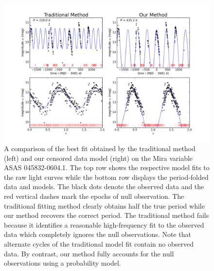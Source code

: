 \documentclass[12pt,preprint]{aastex}
\begin{document}
\clearpage
\begin{figure}
  \begin{center}
\includegraphics[angle=0,width=6.5in]{fig_045832-0604_1.png}
  \end{center}
  \caption{A comparison of the best fit obtained by the traditional method (left) and our censored data model (right) on the Mira variable ASAS 045832-0604.1.  The top row shows the respective model fits to the raw light curves while the bottom row displays the period-folded data and models.  The black dots denote the observed data and the red vertical dashes mark the epochs of null observation.  The traditional fitting method clearly obtains half the true period while our method recovers the correct period.  The traditional method fails because it identifies a reasonable high-frequency fit to the observed data which completely ignores the null observations.  Note that alternate cycles of the traditional model fit contain no observed data.  By contrast, our method fully accounts for the null observations using a probability model.\label{fig:badfit}}
\end{figure}
\end{document}
